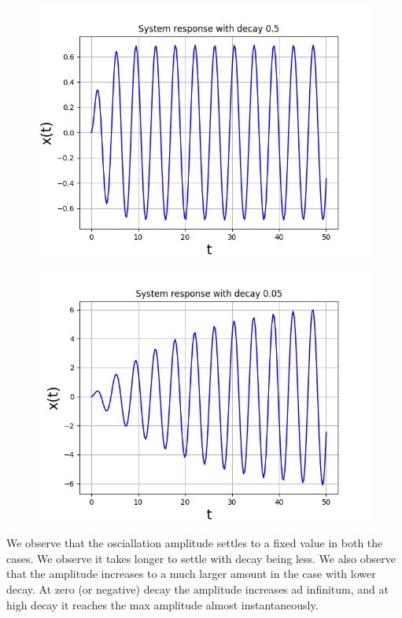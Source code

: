 \documentclass[11pt, a4paper]{article}
\begin{document}
\begin{figure}[!tbh]
   	\centering
   	\includegraphics[scale=0.5]{img1.png}
   	\label{fig:32}
   \end{figure}
\begin{figure}[!tbh]
   	\centering
   	\includegraphics[scale=0.5]{img2.png}
   	\label{fig:32}
   \end{figure}
{
We observe that the osciallation amplitude settles to  a fixed value in both the cases.
We observe it takes longer to settle with decay being less.
We also observe that the amplitude increases to a much larger amount in the case with lower decay.
At zero (or negative) decay the amplitude increases ad infinitum, and at high decay it reaches the max amplitude almost instantaneously.
}
\end{document}
